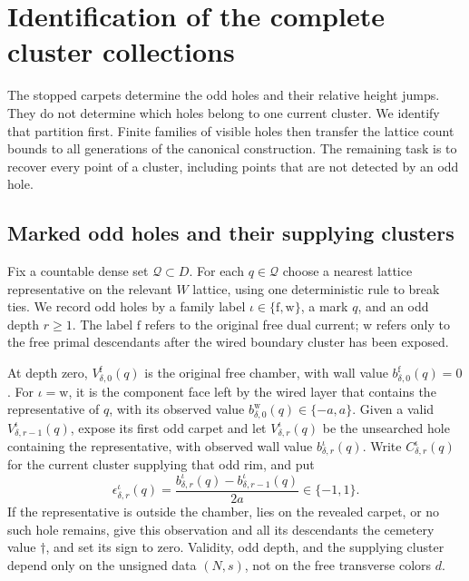 \section{Identification of the complete cluster collections}
\label{sec:identification}

The stopped carpets determine the odd holes and their relative height
jumps. They do not determine which holes belong to one current cluster.
We identify that partition first. Finite families of visible holes then
transfer the lattice count bounds to all generations of the canonical
construction. The remaining task is to recover every point of a cluster,
including points that are not detected by an odd hole.

\subsection{Marked odd holes and their supplying clusters}

Fix a countable dense set \(\mathcal Q\subset D\). For each \(q\in\mathcal Q\)
choose a nearest lattice representative on the relevant \(W\) lattice,
using one deterministic rule to break ties. We record odd holes by a
family label \(\iota\in\{\mathrm f,\mathrm w\}\), a mark \(q\), and an
odd depth \(r\geq1\). The label \(\mathrm f\) refers to the original free
dual current; \(\mathrm w\) refers only to the free primal descendants
after the wired boundary cluster has been exposed.

At depth zero, \(V_{\delta,0}^{\mathrm f}(q)\) is the original free
chamber, with wall value \(b_{\delta,0}^{\mathrm f}(q)=0\).
For \(\iota=\mathrm w\), it is the component face left by the wired
layer that contains the representative of \(q\), with its observed
value \(b_{\delta,0}^{\mathrm w}(q)\in\{-a,a\}\).
Given a valid \(V_{\delta,r-1}^{\iota}(q)\), expose its first odd
carpet and let \(V_{\delta,r}^{\iota}(q)\) be the unsearched hole
containing the representative, with observed wall value
\(b_{\delta,r}^{\iota}(q)\). Write \(C_{\delta,r}^{\iota}(q)\)
for the current cluster supplying that odd rim, and put
\[
 \epsilon_{\delta,r}^{\iota}(q)
   =\frac{b_{\delta,r}^{\iota}(q)
               -b_{\delta,r-1}^{\iota}(q)}{2a}\in\{-1,1\}.
\]
If the representative is outside the chamber, lies on the revealed
carpet, or no such hole remains, give this observation and all its
descendants the cemetery value \(\dagger\), and set its sign to zero.
Validity, odd depth, and the supplying cluster depend only on the
unsigned data \((N,s)\), not on the free transverse colors \(d\).

